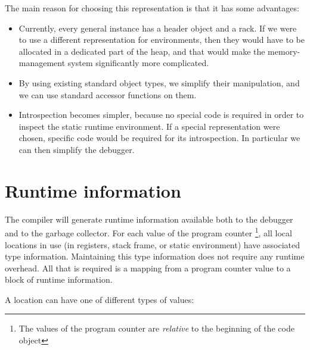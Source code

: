 The main reason for choosing this representation is that it has
some advantages:

\begin{itemize}
\item Currently, every general instance has a header object and a
  rack.  If we were to use a different representation for
  environments, then they would have to be allocated in a dedicated
  part of the heap, and that would make the memory-management system
  significantly more complicated.
\item By using existing standard object types, we simplify their
  manipulation, and we can use standard accessor functions on them.
\item Introspection becomes simpler, because no special code is
  required in order to inspect the static runtime environment.  If a
  special representation were chosen, specific code would be required
  for its introspection.  In particular we can then simplify the
  debugger. 
\end{itemize}

\section{Runtime information}

The compiler will generate runtime information available both to the
debugger and to the garbage collector.  For each value of the program
counter%
\footnote{The values of the program counter are \emph{relative} to the
  beginning of the code object}, all local locations in use (in
registers, stack frame, or static environment) have associated type
information.  Maintaining this type information does not require any
runtime overhead.  All that is required is a mapping from a program
counter value to a block of runtime information.

A location can have one of different types of values:

